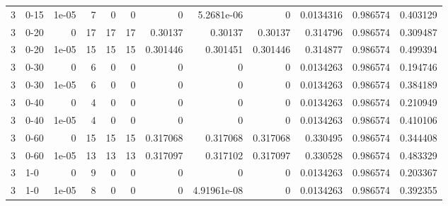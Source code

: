 \begin{tabular}{rlrrrrrrrrrr}
     3 & 0-15   &      1e-05 &           7 &                 0 &                 0 &     0           &     5.2681e-06  &      0           &        0.0134316 &               0.986574 &           0.403129 \\
     3 & 0-20   &      0     &          17 &                17 &                17 &     0.30137     &     0.30137     &      0.30137     &        0.314796  &               0.986574 &           0.309487 \\
     3 & 0-20   &      1e-05 &          15 &                15 &                15 &     0.301446    &     0.301451    &      0.301446    &        0.314877  &               0.986574 &           0.499394 \\
     3 & 0-30   &      0     &           6 &                 0 &                 0 &     0           &     0           &      0           &        0.0134263 &               0.986574 &           0.194746 \\
     3 & 0-30   &      1e-05 &           6 &                 0 &                 0 &     0           &     0           &      0           &        0.0134263 &               0.986574 &           0.384189 \\
     3 & 0-40   &      0     &           4 &                 0 &                 0 &     0           &     0           &      0           &        0.0134263 &               0.986574 &           0.210949 \\
     3 & 0-40   &      1e-05 &           4 &                 0 &                 0 &     0           &     0           &      0           &        0.0134263 &               0.986574 &           0.410106 \\
     3 & 0-60   &      0     &          15 &                15 &                15 &     0.317068    &     0.317068    &      0.317068    &        0.330495  &               0.986574 &           0.344408 \\
     3 & 0-60   &      1e-05 &          13 &                13 &                13 &     0.317097    &     0.317102    &      0.317097    &        0.330528  &               0.986574 &           0.483329 \\
     3 & 1-0    &      0     &           9 &                 0 &                 0 &     0           &     0           &      0           &        0.0134263 &               0.986574 &           0.203367 \\
     3 & 1-0    &      1e-05 &           8 &                 0 &                 0 &     0           &     4.91961e-08 &      0           &        0.0134263 &               0.986574 &           0.392355 \\

\end{tabular}
